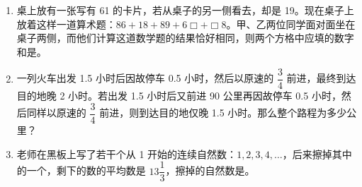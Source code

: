 \documentclass[UTF8,12pt,a4paper]{ctexart}
\newcommand{\BottomWriteSpace}{0.5cm}
\newenvironment{OnePageEightFill}{
  \small
  \vspace*{0pt}
  \begin{enumerate}[leftmargin=*, itemsep=0pt, topsep=0pt, parsep=0pt, partopsep=0pt]
  \setlength{\parskip}{0pt}
}{
  \end{enumerate}
  \vspace*{\BottomWriteSpace}
  \normalsize
  \newpage
}
\newcommand{\Q}[1]{\item #1\par\vfill}
\newcommand{\Qlast}[1]{\item #1\par}
\begin{document}
\begin{OnePageEightFill}
\Q{桌上放有一张写有 61 的卡片，若从桌子的另一侧看去，却是 19。现在桌子上放着这样一道算术题：$86 + 18 + 89 + 6\Box + \Box8$。甲、乙两位同学面对面坐在桌子两侧，而他们计算这道数学题的结果恰好相同，则两个方格中应填的数字和是\underline{\hspace{3em}}。}

\Q{一列火车出发 1.5 小时后因故停车 0.5 小时，然后以原速的 $\dfrac{3}{4}$ 前进，最终到达目的地晚 2 小时。若出发 1.5 小时后又前进 90 公里再因故停车 0.5 小时，然后同样以原速的 $\dfrac{3}{4}$ 前进，则到达目的地仅晚 1.5 小时。那么整个路程为多少公里？}

\Qlast{老师在黑板上写了若干个从 1 开始的连续自然数：$1, 2, 3, 4, \dots$，后来擦掉其中的一个，剩下的数的平均数是 $13\dfrac{1}{3}$，擦掉的自然数是\underline{\hspace{3em}}。}

\end{OnePageEightFill}

\end{document}

